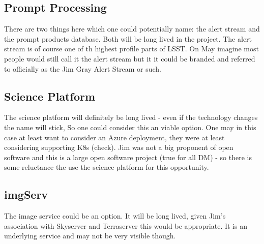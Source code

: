 \subsection{Prompt Processing}
There are two things here which one could potentially name: the alert stream and the prompt products database.
Both will be long lived in the project. The alert stream is of course one of th highest profile parts of LSST.
On May imagine most people would still call it the alert stream but it it could be branded and referred to officially as
the Jim Gray Alert Stream or such.

\subsection{Science Platform} \label{sec:sciplat}
 The science platform will definitely be long lived - even if the technology changes the name will stick, So one could consider this an viable option. One may in this case at least want to consider an Azure deployment, they were at least considering supporting K8s (check).
Jim was not a big proponent of open software and this is a large open software project (true for all DM) - so there is some reluctance the use the science platform for this opportunity.


\subsection{imgServ}
The image service could be an option. It will be long lived, given Jim's association with Skyserver and Terraserver this
would be appropriate. It is an underlying service and may not be very visible though.

